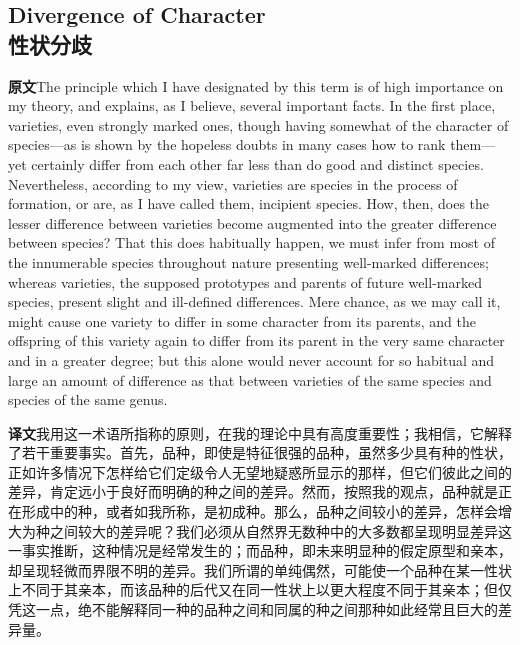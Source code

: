 \documentclass[UTF8,zihao=-4]{ctexart}
\newcommand{\BodyFont}{\fontsize{10.5pt}{15.5pt}\selectfont}
\newcommand{\origlabel}{\textbf{原文}\quad}
\newcommand{\translabel}{\textbf{译文}\quad}
\newenvironment{enblock}{\par\noindent\begingroup\BodyFont\origlabel}{\par\endgroup}
\newenvironment{zhblock}{\par\noindent\begingroup\BodyFont\translabel}{\par\endgroup\vspace{0.35em}}
\newcommand{\pair}[2]{\begin{enblock}#1\end{enblock}\begin{zhblock}#2\end{zhblock}}
\begin{document}
\subsection*{Divergence of Character\\性状分歧}

\pair{The principle which I have designated by this term is of high importance on my theory, and explains, as I believe, several important facts. In the first place, varieties, even strongly marked ones, though having somewhat of the character of species—as is shown by the hopeless doubts in many cases how to rank them—yet certainly differ from each other far less than do good and distinct species. Nevertheless, according to my view, varieties are species in the process of formation, or are, as I have called them, incipient species. How, then, does the lesser difference between varieties become augmented into the greater difference between species? That this does habitually happen, we must infer from most of the innumerable species throughout nature presenting well-marked differences; whereas varieties, the supposed prototypes and parents of future well-marked species, present slight and ill-defined differences. Mere chance, as we may call it, might cause one variety to differ in some character from its parents, and the offspring of this variety again to differ from its parent in the very same character and in a greater degree; but this alone would never account for so habitual and large an amount of difference as that between varieties of the same species and species of the same genus.}{我用这一术语所指称的原则，在我的理论中具有高度重要性；我相信，它解释了若干重要事实。首先，品种，即使是特征很强的品种，虽然多少具有种的性状，正如许多情况下怎样给它们定级令人无望地疑惑所显示的那样，但它们彼此之间的差异，肯定远小于良好而明确的种之间的差异。然而，按照我的观点，品种就是正在形成中的种，或者如我所称，是初成种。那么，品种之间较小的差异，怎样会增大为种之间较大的差异呢？我们必须从自然界无数种中的大多数都呈现明显差异这一事实推断，这种情况是经常发生的；而品种，即未来明显种的假定原型和亲本，却呈现轻微而界限不明的差异。我们所谓的单纯偶然，可能使一个品种在某一性状上不同于其亲本，而该品种的后代又在同一性状上以更大程度不同于其亲本；但仅凭这一点，绝不能解释同一种的品种之间和同属的种之间那种如此经常且巨大的差异量。}
\end{document}
